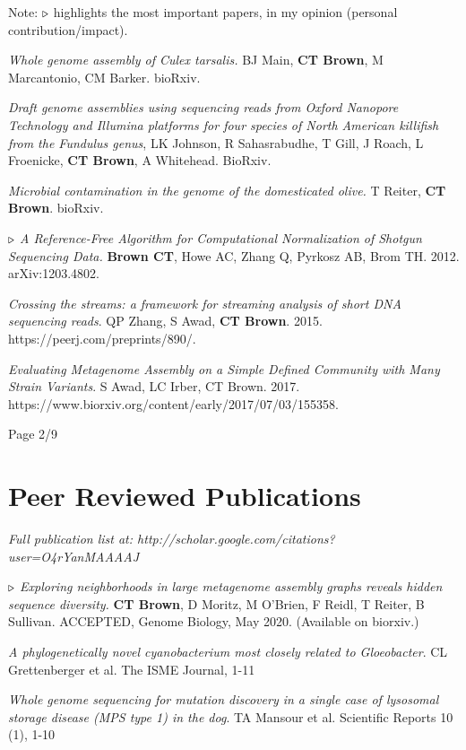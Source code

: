\documentclass[margin,line]{resume}
\begin{document}
\begin{resume}
Note: {\color{red} ${\bf \triangleright}$} highlights the most important
papers, in my opinion (personal contribution/impact).

{\em Whole genome assembly of Culex tarsalis.} BJ Main, {\bf CT Brown}, M Marcantonio, CM Barker. bioRxiv.

{\em Draft genome assemblies using sequencing reads from Oxford Nanopore Technology and Illumina platforms for four species of North American killifish from the Fundulus genus}, LK Johnson, R Sahasrabudhe, T Gill, J Roach, L Froenicke, {\bf CT Brown}, A Whitehead. BioRxiv.

{\em Microbial contamination in the genome of the domesticated olive.} T Reiter, {\bf CT Brown}. bioRxiv.

{\color{red} ${\bf \triangleright}$}
{\em A Reference-Free Algorithm for Computational Normalization of Shotgun Sequencing Data.} {\bf Brown CT}, Howe AC, Zhang Q, Pyrkosz AB, Brom TH. 2012. arXiv:1203.4802.

{\em Crossing the streams: a framework for streaming analysis of short DNA sequencing reads}. QP Zhang, S Awad, {\bf CT Brown}. 2015. https://peerj.com/preprints/890/.

{\em Evaluating Metagenome Assembly on a Simple Defined Community with Many Strain Variants}. S Awad, LC Irber, CT Brown. 2017. https://www.biorxiv.org/content/early/2017/07/03/155358.

\vspace{1cm}
{\centerline {Page 2/9}}

\newpage

\section{\mysidestyle Peer Reviewed Publications}

{\em Full publication list at: http://scholar.google.com/citations?user=O4rYanMAAAAJ}

{\color{red} ${\bf \triangleright}$}
{\em Exploring neighborhoods in large metagenome assembly graphs reveals hidden sequence diversity.} {\bf CT Brown}, D Moritz, M O'Brien, F Reidl, T Reiter, B Sullivan. ACCEPTED, Genome Biology, May 2020. (Available on biorxiv.)

{\em A phylogenetically novel cyanobacterium most closely related to Gloeobacter}. CL Grettenberger et al.
The ISME Journal, 1-11

{\em Whole genome sequencing for mutation discovery in a single case of lysosomal storage disease (MPS type 1) in the dog}. TA Mansour et al. 
Scientific Reports 10 (1), 1-10


\end{resume}
\end{document}
